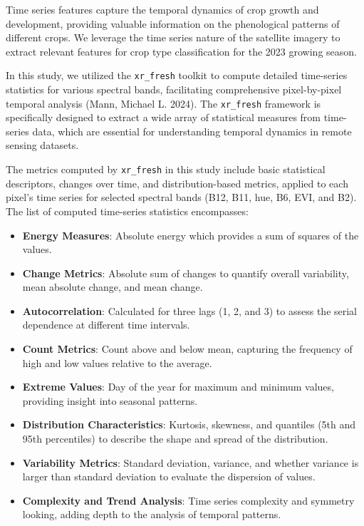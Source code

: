 \documentclass[
  journal,
  twocolumn]{IEEEtran}
\providecommand{\tightlist}{%
  \setlength{\itemsep}{0pt}\setlength{\parskip}{0pt}}
\begin{document}
Time series features capture the temporal dynamics of crop growth and
development, providing valuable information on the phenological patterns
of different crops. We leverage the time series nature of the satellite
imagery to extract relevant features for crop type classification for
the 2023 growing season.

In this study, we utilized the \texttt{xr\_fresh} toolkit to compute
detailed time-series statistics for various spectral bands, facilitating
comprehensive pixel-by-pixel temporal analysis (Mann, Michael L. 2024).
The \texttt{xr\_fresh} framework is specifically designed to extract a
wide array of statistical measures from time-series data, which are
essential for understanding temporal dynamics in remote sensing
datasets.

The metrics computed by \texttt{xr\_fresh} in this study include basic
statistical descriptors, changes over time, and distribution-based
metrics, applied to each pixel's time series for selected spectral bands
(B12, B11, hue, B6, EVI, and B2). The list of computed time-series
statistics encompasses:

\begin{itemize}
\tightlist
\item
  \textbf{Energy Measures}: Absolute energy which provides a sum of
  squares of the values.
\item
  \textbf{Change Metrics}: Absolute sum of changes to quantify overall
  variability, mean absolute change, and mean change.
\item
  \textbf{Autocorrelation}: Calculated for three lags (1, 2, and 3) to
  assess the serial dependence at different time intervals.
\item
  \textbf{Count Metrics}: Count above and below mean, capturing the
  frequency of high and low values relative to the average.
\item
  \textbf{Extreme Values}: Day of the year for maximum and minimum
  values, providing insight into seasonal patterns.
\item
  \textbf{Distribution Characteristics}: Kurtosis, skewness, and
  quantiles (5th and 95th percentiles) to describe the shape and spread
  of the distribution.
\item
  \textbf{Variability Metrics}: Standard deviation, variance, and
  whether variance is larger than standard deviation to evaluate the
  dispersion of values.
\item
  \textbf{Complexity and Trend Analysis}: Time series complexity and
  symmetry looking, adding depth to the analysis of temporal patterns.
\end{itemize}
\end{document}
